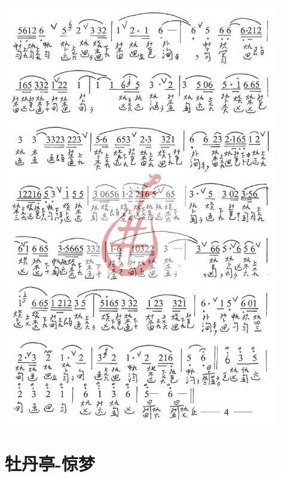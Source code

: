 \documentclass[cn,pad,twocol]{elegantbook}
\begin{document}
\paragraph*{\includegraphics[width=0.9\textwidth]{mudanting/2021-牡丹亭-04游园}} 

\section{牡丹亭-惊梦}
\end{document}
